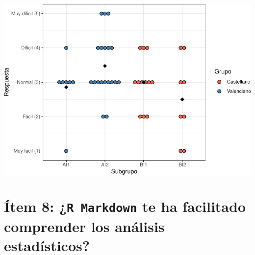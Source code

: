 \documentclass[
]{article}
\newenvironment{Shaded}{\begin{snugshade}}{\end{snugshade}}
\newcommand{\AttributeTok}[1]{\textcolor[rgb]{0.13,0.29,0.53}{#1}}
\newcommand{\FunctionTok}[1]{\textcolor[rgb]{0.13,0.29,0.53}{\textbf{#1}}}
\newcommand{\NormalTok}[1]{#1}
\newcommand{\OtherTok}[1]{\textcolor[rgb]{0.56,0.35,0.01}{#1}}
\newcommand{\SpecialCharTok}[1]{\textcolor[rgb]{0.81,0.36,0.00}{\textbf{#1}}}
\begin{document}
\includegraphics{informe_files/figure-latex/unnamed-chunk-8-1.pdf}

\hypertarget{uxedtem-8-te-ha-facilitado-comprender-los-anuxe1lisis-estaduxedsticos}{%
\section{\texorpdfstring{Ítem 8: ¿\texttt{R Markdown} te ha facilitado
comprender los análisis
estadísticos?}{Ítem 8: ¿ te ha facilitado comprender los análisis estadísticos?}}\label{uxedtem-8-te-ha-facilitado-comprender-los-anuxe1lisis-estaduxedsticos}}

\begin{Shaded}
\end{Shaded}
\end{document}
